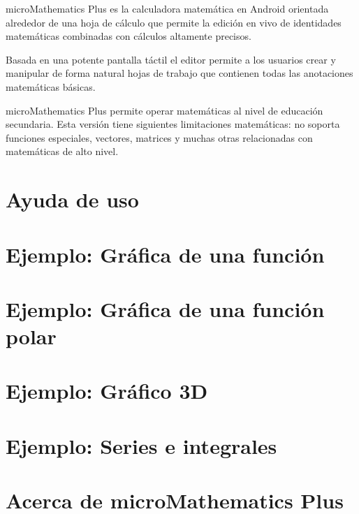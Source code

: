 \documentclass[DIV=calc, paper=a4, fontsize=11pt, twocolumn]{scrartcl}
\begin{document}
\maketitle
\thispagestyle{fancy} %

\begin{bf}
microMathematics Plus es la
calculadora matemática en Android
orientada alrededor de una hoja de
cálculo que permite la edición en vivo
de identidades matemáticas combinadas
con cálculos altamente precisos.

Basada en una potente pantalla táctil
el editor permite a los usuarios crear
y manipular de forma natural hojas de
trabajo que contienen todas las
anotaciones matemáticas básicas.

microMathematics Plus permite operar
matemáticas al nivel de educación
secundaria. Esta versión tiene
siguientes limitaciones matemáticas:
no soporta funciones especiales,
vectores, matrices y muchas otras
relacionadas con matemáticas de alto nivel.
\end{bf}

\section{Ayuda de uso}


\section{Ejemplo: Gráfica de una función}


\section{Ejemplo: Gráfica de una función polar}


\section{Ejemplo: Gráfico 3D}


\section{Ejemplo: Series e integrales}


\section{Acerca de microMathematics Plus}
\end{document}
